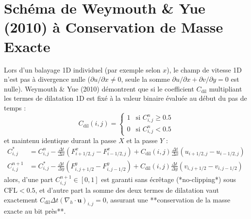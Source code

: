 \documentclass[10pt,a4paper,oneside]{book}
\begin{document}
\section{Schéma de Weymouth \& Yue (2010) à Conservation de Masse Exacte}
Lors d'un balayage 1D individuel (par exemple selon $x$), le champ de vitesse 1D n'est pas à divergence nulle ($\partial u / \partial x \ne 0$, seule la somme $\partial u / \partial x + \partial v / \partial y = 0$ est nulle). Weymouth \& Yue (2010) démontrent que si le coefficient $C_{\text{dil}}$ multipliant les termes de dilatation 1D est fixé à la valeur binaire évaluée au début du pas de temps :
\begin{equation}
  C_{\text{dil}}(i, j) = \begin{cases} 1 & \text{si } C_{i,j}^n \ge 0.5 \\ 0 & \text{si } C_{i,j}^n < 0.5 \end{cases}
\end{equation}
et maintenu identique durant la passe $X$ et la passe $Y$ :
\begin{align}
  C_{i,j}^* &= C_{i,j}^n - \frac{\Delta t}{\Delta x} \left( F_{i+1/2, j}^x - F_{i-1/2, j}^x \right) + C_{\text{dil}}(i,j) \frac{\Delta t}{\Delta x} \left( u_{i+1/2, j} - u_{i-1/2, j} \right) \\
  C_{i,j}^{n+1} &= C_{i,j}^* - \frac{\Delta t}{\Delta y} \left( F_{i, j+1/2}^y - F_{i, j-1/2}^y \right) + C_{\text{dil}}(i,j) \frac{\Delta t}{\Delta y} \left( v_{i, j+1/2} - v_{i, j-1/2} \right)
\end{align}
alors, d'une part $C_{i,j}^{n+1} \in [0, 1]$ est garanti sans écrêtage (*no-clipping*) sous $\text{CFL} < 0.5$, et d'autre part la somme des deux termes de dilatation vaut exactement $C_{\text{dil}} \Delta t (\nabla_h \cdot \mathbf{u})_{i,j} = 0$, assurant une **conservation de la masse exacte au bit près**.
\end{document}

